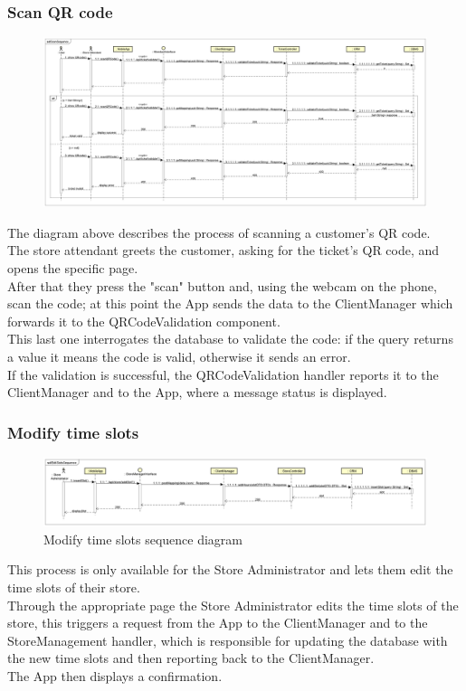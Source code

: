 \documentclass[table, 12pt]{article}
\begin{document}
\subsubsection{Scan QR code}
\begin{figure}[H]
    \begin{center}
        \includegraphics[width=\textwidth]{assets/Sequence-Diagram/ScanSequence.png}
    \end{center}
\end{figure}
The diagram above describes the process of scanning a customer's QR code.\\
The store attendant greets the customer, asking for the ticket's QR code, and opens the specific page.\\
After that they press the "scan" button and, using the webcam on the phone, scan the code; at this point the App sends the data to the ClientManager which forwards it to the QRCodeValidation component.\\
This last one interrogates the database to validate the code: if the query returns a value it means the code is valid, otherwise it sends an error.\\
If the validation is successful, the QRCodeValidation handler reports it to the ClientManager and to the App, where a message status is displayed.
\subsubsection{Modify time slots}
\begin{figure}[H]
    \begin{center}
        \includegraphics[width=\textwidth]{assets/Sequence-Diagram/EditSlotsSequence.png}
        \caption{Modify time slots sequence diagram}
    \end{center}
\end{figure}
This process is only available for the Store Administrator  and lets them edit the time slots of their store.\\
Through the appropriate page the Store Administrator edits the time slots of the store, this triggers a request from the App to the ClientManager and to the StoreManagement handler, which is responsible for updating the database with the new time slots and then reporting back to the ClientManager.\\
The App then displays a confirmation.
\end{document}
